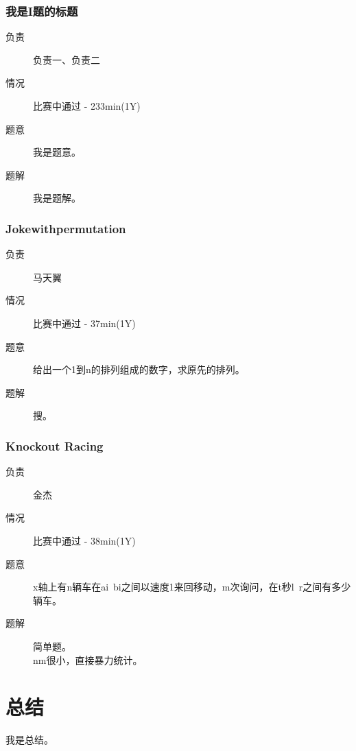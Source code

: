 \documentclass[a4paper, 11pt, nofonts, nocap, fancyhdr]{ctexart}
\newcommand{\problem}[1]{\subsubsection{#1}}
\begin{document}
\problem{我是I题的标题}

\begin{description}
\item[负责] 负责一、负责二
\item[情况] 比赛中通过 - 233min(1Y)
\item[题意]
我是题意。
\item[题解]
我是题解。
\end{description}

\problem{Jokewithpermutation}

\begin{description}
\item[负责]马天翼
\item[情况] 比赛中通过 - 37min(1Y)
\item[题意]
给出一个1到n的排列组成的数字，求原先的排列。
\item[题解]
搜。
\end{description}

\problem{Knockout Racing}

\begin{description}
\item[负责] 金杰
\item[情况] 比赛中通过 - 38min(1Y)
\item[题意]
x轴上有n辆车在ai~bi之间以速度1来回移动，m次询问，在t秒l~r之间有多少辆车。
\item[题解]
简单题。\\
nm很小，直接暴力统计。
\end{description}

\section{总结}

我是总结。
\end{document}

